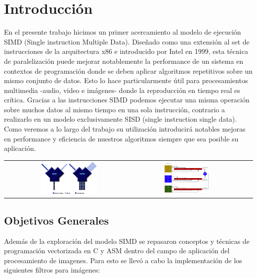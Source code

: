 \section{Introducción}
En el presente trabajo hicimos un primer acercamiento al modelo de ejecución SIMD (Single instruction Multiple Data). Diseñado como una extensión al set de instrucciones de la arquitectura x86 e introducido por Intel en 1999, esta técnica de paralelización puede mejorar notablemente la performance de un sistema en contextos de programación donde se deben aplicar algoritmos repetitivos sobre un mismo conjunto de datos. Esto lo hace particularmente útil para procesamientos multimedia -audio, video e imágenes- donde la reproducción en tiempo real es crítica. Gracias a las instrucciones SIMD podemos ejecutar una misma operación sobre muchos datos al mismo tiempo en una sola instrucción, contrario a realizarlo en un modelo exclusivamente SISD (single instruction single data). Como veremos a lo largo del trabajo su utilización introducirá notables mejoras en performance y eficiencia de nuestros algoritmos siempre que sea posible su aplicación.

\begin{center}
  \begin{tabular}{cccc}
    \includegraphics[width=0.45\textwidth]{imagenes/sisdsimd.png} &
    \includegraphics[width=0.45\textwidth]{imagenes/registrossimd.png}\\
  \end{tabular}
 \end{center}

\subsection{Objetivos Generales}
Además de la exploración del modelo SIMD se repasaron conceptos y técnicas de programación vectorizada en C y ASM dentro del campo de aplicación del procesamiento de imagenes. Para esto se llevó a cabo la implementación de los siguientes filtros para imágenes:

